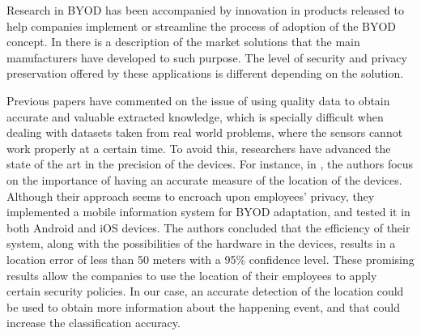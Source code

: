 \documentclass[runningheads]{llncs}
\begin{document}
Research in BYOD has been accompanied by innovation in products released
to help companies implement or streamline the process of adoption of the BYOD
concept. In \cite{de2015corporate} there is a description of the
market solutions that the main manufacturers have developed to such
purpose. The level of security and privacy preservation offered by
these applications is different depending on the solution.


Previous papers have commented on the issue of using quality data to obtain accurate and valuable extracted knowledge, which is specially difficult when dealing with datasets taken from real world problems, where the sensors cannot work properly at a certain time.
To avoid this, researchers have advanced the state of the art in the precision of the
devices. For instance, in \cite{rios2015mobile}, the authors focus on
the importance of having an accurate measure of the location of the
devices. Although their approach seems to encroach upon employees'
privacy, they implemented a mobile information system for BYOD
adaptation, and tested it in both Android and iOS devices. The authors
concluded that the efficiency of their system, along with the
possibilities of the hardware in the devices, results in a location
error of less than 50 meters with a 95\% confidence level. These
promising results allow the companies to use the location of their
employees to apply certain security policies. In our case, an accurate detection of the location could be used to obtain more information about the happening event, and that could increase the classification accuracy. 

\end{document}
